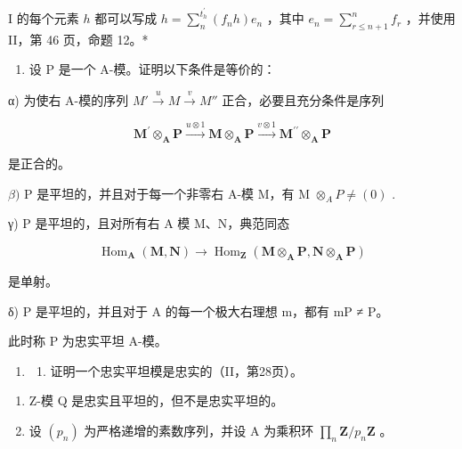 I 的每个元素 \(h\) 都可以写成 \(h = \sum_{n}^{t_{h}^{\prime}} (f_n h) e_n\) ，其中 \(e_n = \sum_{r \leqslant n+1}^{n} f_r\) ，并使用 II，第 46 页，命题 12。*

\begin{enumerate}
\def\labelenumi{\arabic{enumi})}
\setcounter{enumi}{8}
\tightlist
\item
  设 P 是一个 A-模。证明以下条件是等价的：
\end{enumerate}

α) 为使右 A-模的序列 \(M' \xrightarrow{u} M \xrightarrow{v} M''\) 正合，必要且充分条件是序列

\[
\mathbf {M} ^ {\prime} \otimes_ {\mathbf {A}} \mathbf {P} \xrightarrow {u \otimes 1} \mathbf {M} \otimes_ {\mathbf {A}} \mathbf {P} \xrightarrow {v \otimes 1} \mathbf {M} ^ {\prime \prime} \otimes_ {\mathbf {A}} \mathbf {P}
\]

是正合的。

\(\beta)\) P 是平坦的，并且对于每一个非零右 A-模 M，有 M \(\otimes_{A} P \neq (0)\) .

γ) P 是平坦的，且对所有右 A 模 M、N，典范同态

\[
\operatorname{Hom} _ {\mathbf {A}} (\mathbf {M}, \mathbf {N}) \rightarrow \operatorname{Hom} _ {\mathbf {Z}} (\mathbf {M} \otimes_ {\mathbf {A}} \mathbf {P}, \mathbf {N} \otimes_ {\mathbf {A}} \mathbf {P})
\]

是单射。

δ) P 是平坦的，并且对于 A 的每一个极大右理想 m，都有 mP ≠ P。

此时称 P 为忠实平坦 A-模。

\begin{enumerate}
\def\labelenumi{\arabic{enumi})}
\setcounter{enumi}{9}
\tightlist
\item
  \begin{enumerate}
  \def\labelenumii{\alph{enumii})}
  \tightlist
  \item
    证明一个忠实平坦模是忠实的（II，第28页）。
  \end{enumerate}
\end{enumerate}

\begin{enumerate}
\def\labelenumi{\alph{enumi})}
\setcounter{enumi}{1}
\item
  Z-模 Q 是忠实且平坦的，但不是忠实平坦的。
\item
  设 \((p_n)\) 为严格递增的素数序列，并设 A 为乘积环 \(\prod_{n} \mathbf{Z}/p_n \mathbf{Z}\) 。
\end{enumerate}

